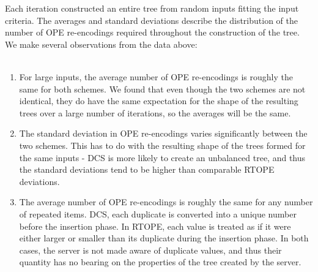 \documentclass[12pt]{article}
\begin{document}
Each iteration constructed an entire tree from random inputs fitting the input criteria. The averages and standard deviations describe the distribution of the number of OPE re-encodings required throughout the construction of the tree. We make several observations from the data above:  \\ \\
\begin{enumerate}
\item For large inputs, the average number of OPE re-encodings is roughly the same for both schemes. We found that even though the two schemes are not identical, they do have the same expectation for the shape of the resulting trees over a large number of iterations, so the averages will be the same.
\item The standard deviation in OPE re-encodings varies significantly between the two schemes. This has to do with the resulting shape of the trees formed for the same inputs - DCS is more likely to create an unbalanced tree, and thus the standard deviations tend to be higher than comparable RTOPE deviations.
\item
The average number of OPE re-encodings is roughly the same for any number of repeated items. DCS, each duplicate is converted into a unique number before the insertion phase. In RTOPE, each value is treated as if it were either larger or smaller than its duplicate during the insertion phase. In both cases, the server is not made aware of duplicate values, and thus their quantity has no bearing on the properties of the tree created by the server.
\end{enumerate}
\end{document}

